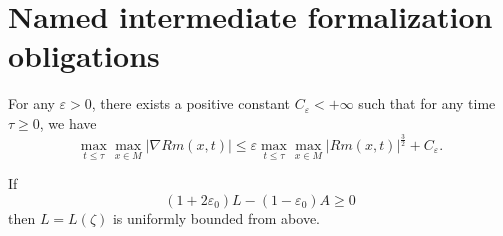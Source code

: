 \section{Named intermediate formalization obligations}
\begin{lemma}
  \label{lem:cz-three-dimensional-pinching-curvature-gradient}
For any $\varepsilon>0$, there exists a positive
constant $C_\varepsilon<+\infty$ such that for any time $\tau\ge
0$, we have
$$
\max_{t\le\tau}\max_{x\in M}|\nabla Rm(x,t)| \le \varepsilon
\max_{t\le\tau}\max_{x\in M}|Rm(x,t)|^\frac{3}{2}+C_\varepsilon.
$$

\end{lemma}
\begin{lemma}
  \label{lem:cz-hyperbolic-cusp-length-bounded}
If
$$
(1+2\varepsilon_0)L-(1-\varepsilon_0)A\geq 0
$$
then $L=L(\zeta)$ is uniformly bounded from above.

\end{lemma}
